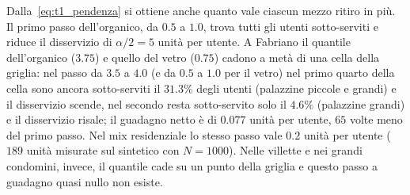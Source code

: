 \begin{table}[htbp]
	\centering
	\caption{Frequenza ideale al quantile $83.3\%$ $\rightarrow$ frequenza della griglia con disservizio minimo, calcolata con le proporzioni nominali del mix. In tutti i 30 casi coincide con $X_r^*$ di CW a $\gamma=0.95$ (mediana sui seed; Fabriano: istanza completa).}
	\label{tab:t1_quantile}
\end{table}

Dalla~\eqref{eq:t1_pendenza} si ottiene anche quanto vale ciascun mezzo ritiro in più. Il primo passo dell'organico, da $0.5$ a $1.0$, trova tutti gli utenti sotto-serviti e riduce il disservizio di $\alpha/2=5$ unità per utente. A Fabriano il quantile dell'organico ($3.75$) e quello del vetro ($0.75$) cadono a metà di una cella della griglia: nel passo da $3.5$ a $4.0$ (e da $0.5$ a $1.0$ per il vetro) nel primo quarto della cella sono ancora sotto-serviti il $31.3\%$ degli utenti (palazzine piccole e grandi) e il disservizio scende, nel secondo resta sotto-servito solo il $4.6\%$ (palazzine grandi) e il disservizio risale; il guadagno netto è di $0.077$ unità per utente, $65$ volte meno del primo passo. Nel mix residenziale lo stesso passo vale $0.2$ unità per utente ($189$ unità misurate sul sintetico con $N=1000$). Nelle villette e nei grandi condomini, invece, il quantile cade su un punto della griglia e questo passo a guadagno quasi nullo non esiste.

